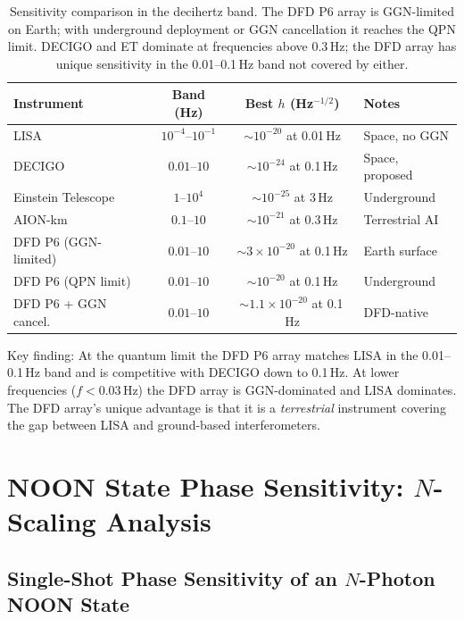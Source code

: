 \documentclass[11pt]{article}
\theoremstyle{definition}
\theoremstyle{remark}
\begin{document}
\begin{table}[h]
\centering
\caption{Sensitivity comparison in the decihertz band. The DFD P6 array is
GGN-limited on Earth; with underground deployment or GGN cancellation it
reaches the QPN limit. DECIGO and ET dominate at frequencies above 0.3\,Hz;
the DFD array has unique sensitivity in the 0.01--0.1\,Hz band not covered
by either.}
\begin{tabular}{@{}lccl@{}}
\toprule
Instrument & Band (Hz) & Best $h$ (Hz$^{-1/2}$) & Notes \\
\midrule
LISA & $10^{-4}$--$10^{-1}$ & $\sim 10^{-20}$ at 0.01\,Hz & Space, no GGN \\
DECIGO & $0.01$--$10$ & $\sim 10^{-24}$ at 0.1\,Hz & Space, proposed \\
Einstein Telescope & $1$--$10^4$ & $\sim 10^{-25}$ at 3\,Hz & Underground \\
AION-km & $0.1$--$10$ & $\sim 10^{-21}$ at 0.3\,Hz & Terrestrial AI \\
DFD P6 (GGN-limited) & $0.01$--$10$ & $\sim 3\times10^{-20}$ at 0.1\,Hz & Earth surface \\
DFD P6 (QPN limit) & $0.01$--$10$ & $\sim 10^{-20}$ at 0.1\,Hz & Underground \\
DFD P6 + GGN cancel. & $0.01$--$10$ & $\sim 1.1\times10^{-20}$ at 0.1\,Hz & DFD-native \\
\bottomrule
\end{tabular}
\end{table}

Key finding: At the quantum limit the DFD P6 array matches LISA in the
0.01--0.1\,Hz band and is competitive with DECIGO down to 0.1\,Hz. At
lower frequencies ($f < 0.03$\,Hz) the DFD array is GGN-dominated and LISA
dominates. The DFD array's unique advantage is that it is a \emph{terrestrial}
instrument covering the gap between LISA and ground-based interferometers.

\section{NOON State Phase Sensitivity: $N$-Scaling Analysis}

\subsection{Single-Shot Phase Sensitivity of an $N$-Photon NOON State}
\end{document}
